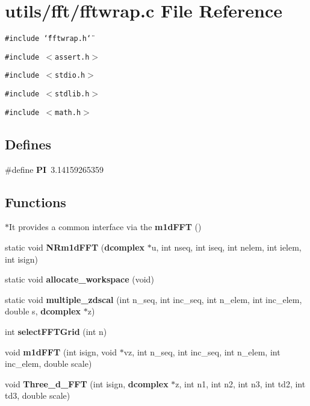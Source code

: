 \section{utils/fft/fftwrap.c File Reference}
\label{fftwrap_8c}
{\tt \#include \char`\"{}fftwrap.h\char`\"{}}\par
{\tt \#include $<$assert.h$>$}\par
{\tt \#include $<$stdio.h$>$}\par
{\tt \#include $<$stdlib.h$>$}\par
{\tt \#include $<$math.h$>$}\par
\subsection*{Defines}
\begin{CompactItemize}
\item 
\#define {\bf PI}~3.14159265359
\end{CompactItemize}
\subsection*{Functions}
\begin{CompactItemize}
\item 
$\ast$It provides a common interface via the {\bf m1d\-FFT} ()
\item 
static void {\bf NRm1d\-FFT} ({\bf dcomplex} $\ast$u, int nseq, int iseq, int nelem, int ielem, int isign)
\item 
static void {\bf allocate\_\-workspace} (void)
\item 
static void {\bf multiple\_\-zdscal} (int n\_\-seq, int inc\_\-seq, int n\_\-elem, int inc\_\-elem, double s, {\bf dcomplex} $\ast$z)
\item 
int {\bf select\-FFTGrid} (int n)
\item 
void {\bf m1d\-FFT} (int isign, void $\ast$vz, int n\_\-seq, int inc\_\-seq, int n\_\-elem, int inc\_\-elem, double scale)
\item 
void {\bf Three\_\-d\_\-FFT} (int isign, {\bf dcomplex} $\ast$z, int n1, int n2, int n3, int td2, int td3, double scale)
\end{CompactItemize}
